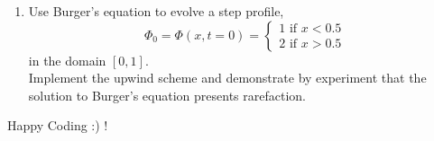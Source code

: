 \documentclass[11pt]{article}
\begin{document}
\begin{enumerate}
\item Use Burger's equation to evolve a step profile,
\begin{equation}
\Phi_0 = \Phi(x,t=0) = 
\begin{cases}
1 \text{ if } x<0.5 \\
2 \text{ if } x>0.5
\end{cases}
\end{equation}
in the domain $[0,1]$. \\

Implement the upwind scheme and demonstrate by experiment
that the solution to Burger's equation presents rarefaction.

\end{enumerate}

Happy Coding :) !
\end{document}
